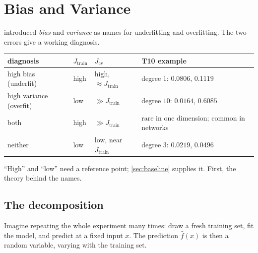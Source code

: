 \section{Bias and Variance}
\label{sec:bias-variance}

 introduced \emph{bias} and \emph{variance} as names for
underfitting and overfitting. The two errors give a working diagnosis.

\begin{center}
\small
\renewcommand{\arraystretch}{1.3}
\begin{tabular}{@{}L{2.6cm}L{2.0cm}L{3.0cm}L{3.2cm}@{}}
\toprule
diagnosis & $J_{\text{train}}$ & $J_{\text{cv}}$ & T10 example\\
\midrule
high bias (underfit) & high & high, $\approx J_{\text{train}}$ & degree $1$: $0.0806$, $0.1119$\\
high variance (overfit) & low & $\gg J_{\text{train}}$ & degree $10$: $0.0164$, $0.6085$\\
both & high & $\gg J_{\text{train}}$ & rare in one dimension; common in networks\\
neither & low & low, near $J_{\text{train}}$ & degree $3$: $0.0219$, $0.0496$\\
\bottomrule
\end{tabular}
\end{center}

``High'' and ``low'' need a reference point; \cref{sec:baseline} supplies it.
First, the theory behind the names.

\subsection{The decomposition}

Imagine repeating the whole experiment many times: draw a fresh training set,
fit the model, and predict at a fixed input $x$. The prediction $\hat f(x)$ is
then a random variable, varying with the training set.

